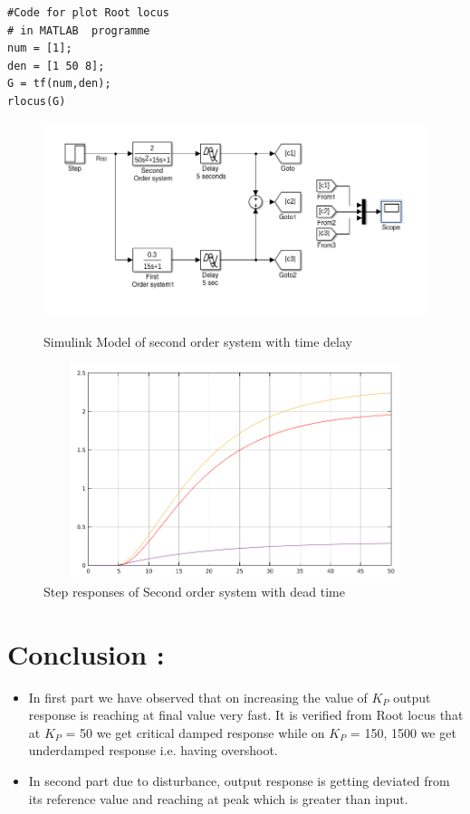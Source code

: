 \message{ !name(lab1.tex)}\documentclass[a4paper,12pt,openany]{book}
\begin{document}
     \begin{minipage}{0.45\linewidth}
       \begin{verbatim}
#Code for plot Root locus
# in MATLAB  programme
num = [1];
den = [1 50 8];
G = tf(num,den);
rlocus(G)
\end{verbatim}
\end{minipage}
 \begin{figure}[ht!]
 \includegraphics[width = 165mm, scale = 0.85]{lab2part21.png}
 \caption{Simulink Model of second order system with time delay}
\includegraphics[width = 165mm, height = 63mm, scale = 0.95]{lab2part22.png}
\caption{Step responses of Second order system with dead time}
\end{figure}
\section{Conclusion :}
\begin{itemize}
\item In first part we have observed that on increasing the value of $K_P$ output response is reaching
at final value very fast. It is verified from Root locus that at $K_P$ = 50 we get critical damped
response while on  $K_P$ = 150, 1500 we get underdamped response i.e. having overshoot.
   \item In second part due to disturbance, output response is getting deviated from its
reference value and reaching at peak which is greater than input.
 \end{itemize}
\end{document}
